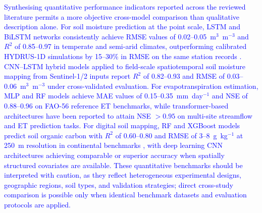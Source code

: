 \documentclass[land,article,submit,pdftex,moreauthors]{Definitions/mdpi}
\numberwithin{equation}{section}
\begin{document}
\textcolor{blue}{Synthesising quantitative performance indicators reported across the reviewed literature permits a more objective cross-model comparison than qualitative description alone. For soil moisture prediction at the point scale, LSTM and BiLSTM networks consistently achieve RMSE values of 0.02--0.05~m$^3$~m$^{-3}$ and $R^2$ of 0.85--0.97 in temperate and semi-arid climates, outperforming calibrated HYDRUS-1D simulations by 15--30\% in RMSE on the same station records \citep{kratzert2018rainfall}. CNN--LSTM hybrid models applied to field-scale spatiotemporal soil moisture mapping from Sentinel-1/2 inputs report $R^2$ of 0.82--0.93 and RMSE of 0.03--0.06~m$^3$~m$^{-3}$ under cross-validated evaluation. For evapotranspiration estimation, MLP and RF models achieve MAE values of 0.15--0.35~mm~day$^{-1}$ and NSE of 0.88--0.96 on FAO-56 reference ET benchmarks, while transformer-based architectures have been reported to attain NSE $> 0.95$ on multi-site streamflow and ET prediction tasks. For digital soil mapping, RF and XGBoost models predict soil organic carbon with $R^2$ of 0.60--0.80 and RMSE of 3--8~g~kg$^{-1}$ at 250~m resolution in continental benchmarks \citep{hengl2017soilgrids250m}, with deep learning CNN architectures achieving comparable or superior accuracy when spatially structured covariates are available. These quantitative benchmarks should be interpreted with caution, as they reflect heterogeneous experimental designs, geographic regions, soil types, and validation strategies; direct cross-study comparison is possible only when identical benchmark datasets and evaluation protocols are applied.}

\footnotesize
\setlength{\LTleft}{0pt}
\setlength{\LTright}{0pt}
\end{document}
